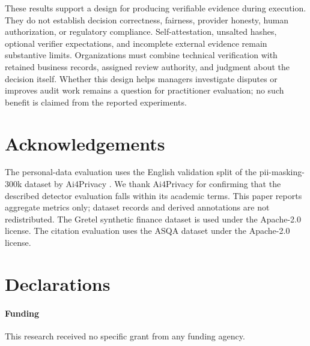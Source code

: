 \documentclass[11pt]{article}
\begin{document}
These results support a design for producing verifiable evidence during execution. They do not establish decision correctness, fairness, provider honesty, human authorization, or regulatory compliance. Self-attestation, unsalted hashes, optional verifier expectations, and incomplete external evidence remain substantive limits. Organizations must combine technical verification with retained business records, assigned review authority, and judgment about the decision itself. Whether this design helps managers investigate disputes or improves audit work remains a question for practitioner evaluation; no such benefit is claimed from the reported experiments.

\section*{Acknowledgements}
The personal-data evaluation uses the English validation split of the pii-masking-300k dataset by Ai4Privacy \citep{ai4privacy}. We thank Ai4Privacy for confirming that the described detector evaluation falls within its academic terms. This paper reports aggregate metrics only; dataset records and derived annotations are not redistributed. The Gretel synthetic finance dataset \citep{gretelfinance} is used under the Apache-2.0 license. The citation evaluation uses the ASQA dataset \citep{asqa} under the Apache-2.0 license.

\section*{Declarations}
\paragraph{Funding} This research received no specific grant from any funding agency.
\end{document}

